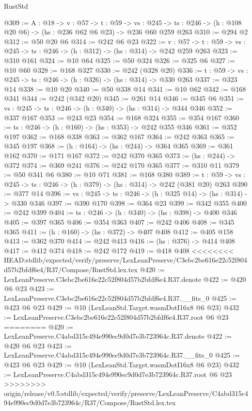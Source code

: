 \begin{lexlean}{RustStd}
\begin{coremodule}
{\begin{coremodule}
@309 := {A : @18} ->
  {v : @57} ->
  {t : @59} ->
  {vs : @245} -> {ts : @246} -> (h : @108 @20 @6) -> (hs : @236 @62 @6 @23) -> @236 @60 @259 @263
@310 := @294 @2
@312 := @50 @20 @6
@314 := @242 @6 @23
@322 := {v : @57} ->
  {t : @59} -> {vs : @245} -> {ts : @246} -> (h : @312) -> (hs : @314) -> @242 @259 @263
@323 := @310 @161
@324 := @10 @64
@325 := @50 @324
@326 := @325 @6
@327 := @10 @60
@328 := @168 @327
@330 := @242 (@328 @20)
@336 := {t : @59} -> {vs : @245} -> {ts : @246} -> (h : @326) -> (hs : @314) -> @330 @263
@337 := @323 @14
@338 := @10 @20
@340 := @50 @338 @14
@341 := @10 @62
@342 := @168 @341
@344 := @242 (@342 @20)
@345 := @261 @14
@346 := @345 @6
@351 := {vs : @245} -> {ts : @246} -> (h : @340) -> (hs : @314) -> @344 @346
@352 := @337 @167
@353 := @243 @23
@354 := @168 @324
@355 := @354 @167
@360 := {ts : @246} -> (h : @160) -> (hs : @353) -> @242 @355 @346
@361 := @352 @197
@362 := @168 @338
@363 := @362 @167
@364 := @242 @363
@365 := @345 @197
@368 := (h : @164) -> (hs : @244) -> @364 @365
@369 := @361 @162
@370 := @171 @167
@372 := @242 @370 @365
@373 := (hs : @244) -> @372
@374 := @369 @241
@376 := @242 @170 @365
@377 := @310 @11
@379 := @50 @341 @6
@380 := @10 @71
@381 := @168 @380
@389 := {t : @59} -> {vs : @245} -> {ts : @246} -> (h : @379) -> (hs : @314) -> @242 (@381 @20) @263
@390 := @377 @14
@396 := {vs : @245} -> {ts : @246} -> (h : @325 @14) -> (hs : @314) -> @330 @346
@397 := @390 @170
@398 := @364 @23
@399 := @342 @355
@400 := @242 @399
@404 := {ts : @246} -> (h : @340) -> (hs : @398) -> @400 @346
@405 := @397 @365
@406 := @354 @363
@407 := @242 @406
@408 := @345 @365
@411 := (h : @160) -> (hs : @372) -> @407 @408
@412 := @405 @158
@413 := @362 @370
@414 := @242 @413
@416 := (hs : @376) -> @414 @408
@417 := @412 @374
@418 := @242 @172
@419 := @418 @408
<<<<<<<< HEAD:stdlib/expected/verify/preserve/LexLeanPreserve/C3ebc2be616e22c52f804d57b2bfdf6e4/R37/Compose/RustStd.lex.tex
@420 := LexLeanPreserve.C3ebc2be616e22c52f804d57b2bfdf6e4.R37.denote
@422 := @420 @6 @23
@423 := LexLeanPreserve.C3ebc2be616e22c52f804d57b2bfdf6e4.R37.__fits_0
@425 := @423 @6 @23
@429 := @10 (LexLeanStd.Target.wasmDotI16x8 @6 @23)
@432 := LexLeanPreserve.C3ebc2be616e22c52f804d57b2bfdf6e4.R37.root @6 @23
========
@420 := LexLeanPreserve.C4abd315c494e990ec9d0d7e3b723964c.R37.denote
@422 := @420 @6 @23
@423 := LexLeanPreserve.C4abd315c494e990ec9d0d7e3b723964c.R37.__fits_0
@425 := @423 @6 @23
@429 := @10 (LexLeanStd.Target.wasmDotI16x8 @6 @23)
@432 := LexLeanPreserve.C4abd315c494e990ec9d0d7e3b723964c.R37.root @6 @23
>>>>>>>> origin/release/v0.5:stdlib/expected/verify/preserve/LexLeanPreserve/C4abd315c494e990ec9d0d7e3b723964c/R37/Compose/RustStd.lex.tex

\end{coremodule}}
\end{coremodule}
\end{lexlean}
